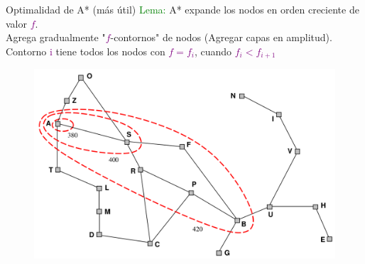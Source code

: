 
\begin{frame}{Optimalidad de A* (más útil)}
\textcolor{Green}{Lema:} A* expande los nodos en orden creciente de valor
\textcolor{Purple}{$f$}.\\[0.2 cm]
Agrega gradualmente "\textcolor{Purple}{$f$}-contornos" de nodos (Agregar capas en
amplitud).\\
Contorno \textcolor{Purple}{i} tiene todos los nodos con \textcolor{Purple}{$f=f_i$},
cuando \textcolor{Purple}{$f_i < f_{i+1}$}
\begin{figure}
    \includegraphics[scale=0.2]{24_chap4a_pag24.png}
\end{figure}
\end{frame}{}
